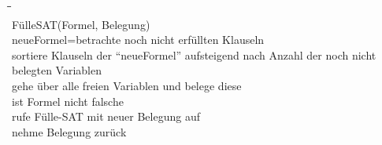 \documentclass[10pt,a4paper]{article}
\begin{document}
    \begin{tabbing}
\quad\=\quad\=\quad\=\quad\=\\
FülleSAT(Formel, Belegung) \\
\>    neueFormel=betrachte noch nicht erfüllten Klauseln \\
\>\>        sortiere Klauseln der “neueFormel” aufsteigend nach Anzahl der noch nicht \\
\>\>        belegten Variablen \\
\>\>        gehe über alle freien Variablen und belege diese\\
\>\>\>            ist Formel nicht falsche\\
\>\>\>\>                rufe Fülle-SAT mit neuer Belegung auf\\
\>\>\>            nehme Belegung zurück\\
    \end{tabbing}
\end{document}
